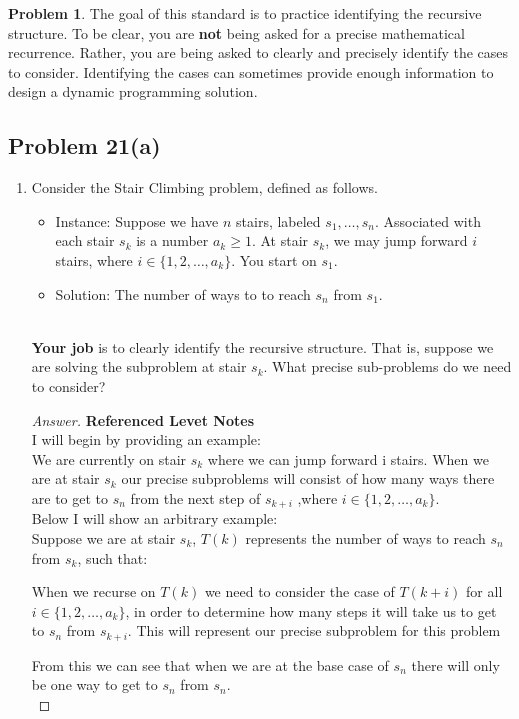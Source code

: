 \documentclass[11pt]{article}
\theoremstyle{definition}
\theoremstyle{definition}
\newtheorem{required}{Problem}
\theoremstyle{definition}
\begin{document}
\setcounter{required}{20}
\begin{required}
The goal of this standard is to practice identifying the recursive structure. To be clear, you are \textbf{not} being asked for a precise mathematical recurrence. Rather, you are being asked to clearly and precisely identify the cases to consider. Identifying the cases can sometimes provide enough information to design a dynamic programming solution.


\subsection*{Problem 21(a)}

\renewcommand{\theenumi}{\alph{enumi}}
\begin{enumerate}
\item Consider the \textsf{Stair Climbing} problem, defined as follows.
\begin{itemize}
\item \textsf{Instance:} Suppose we have $n$ stairs, labeled $s_{1}, \ldots, s_{n}$. Associated with each stair $s_{k}$ is a number $a_{k} \geq 1$. At stair $s_{k}$, we may jump forward $i$ stairs, where $i \in \{ 1, 2, \ldots, a_{k}\}$. You start on $s_{1}$.

\item \textsf{Solution:} The number of ways to to reach $s_{n}$ from $s_{1}$.
\end{itemize}

\noindent \\ \textbf{Your job} is to clearly identify the recursive structure. That is, suppose we are solving the subproblem at stair $s_{k}$. What precise sub-problems do we need to consider?

\begin{proof}[Answer] \textbf{Referenced Levet Notes} \\
I will begin by providing an example: \\ 

We are currently on stair $s_k$ where we can jump forward i stairs. When we are at stair $s_k$ our precise subproblems will consist of how many ways there are to get to $s_n$ from the next step of $s_{k+i}$ ,where $i \in \{ 1, 2, \ldots, a_{k}\}$.\\

Below I will show an arbitrary example: \\
Suppose we are at stair $s_k$,  $T(k)$ represents the number of ways to reach $s_n$ from $s_k$, such that: \\
\begin{center}
When we recurse on $T(k)$ we need to consider the case of $T(k+i)$ for all $i \in \{ 1, 2, \ldots, a_{k}\}$, in order to determine how many steps it will take us to get to $s_n$ from $s_{k+i}$. This will represent our precise subproblem for this problem\\
\end{center}
From this we can see that when we are at the base case of $s_n$ there will only be one way to get to $s_n$ from $s_n$. \\


\end{proof}
\end{enumerate}
\end{required}
\end{document}
